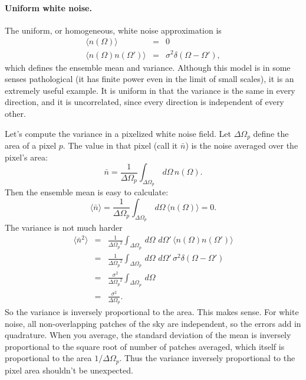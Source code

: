 \paragraph{Uniform white noise.}  The uniform, or homogeneous, white noise approximation is
\begin{eqnarray}
\langle n(\Omega) \rangle &=& 0 \nonumber \\
\langle n(\Omega) n(\Omega') \rangle &=& \sigma^2 \delta(\Omega - \Omega') ,
\end{eqnarray}
which defines the ensemble mean and variance.  Although this model is in some senses pathological (it has finite power even in the limit of small scales), it is an extremely useful example.  It is uniform in that the variance is the same in every direction, and it is uncorrelated, since every direction is independent of every other.

Let's compute the variance in a pixelized white noise field.  Let $\Delta\Omega_p$ define the area of a pixel $p$.  The value in that pixel (call it $\bar n$) is the noise averaged over the pixel's area:
\begin{equation}
\bar n = \frac{1}{\Delta\Omega_p} \int_{\Delta\Omega_p} \,d\Omega\, n(\Omega).
\end{equation}
Then the ensemble mean is easy to calculate:
\begin{equation}
\langle \bar n \rangle= \frac{1}{\Delta\Omega_p} \int_{\Delta\Omega_p} \,d\Omega\, \langle n(\Omega) \rangle = 0.
\end{equation}
The variance is not much harder
\begin{eqnarray}
\langle \bar n^2 \rangle &=& \frac{1}{{\Delta\Omega_p}^2} \int_{\Delta\Omega_p}  \,d\Omega\, \,d\Omega'\,\langle n(\Omega) n(\Omega') \rangle \nonumber \\
&=& \frac{1}{{\Delta\Omega_p}^2} \int_{\Delta\Omega_p}  \,d\Omega\, \,d\Omega'\,\sigma^2 \delta(\Omega - \Omega') \nonumber \\
&=& \frac{\sigma^2}{{\Delta\Omega_p}^2} \int_{\Delta\Omega_p}  \,d\Omega \nonumber \\
&=& \frac{\sigma^2}{{\Delta\Omega_p}}.
\end{eqnarray}
So the variance is inversely proportional to the area.  This makes sense.  For white noise, all non-overlapping patches of the sky are independent, so the errors add in quadrature.  When you average, the standard deviation of the mean is inversely proportional to the square root of number of patches averaged, which itself is proportional to the area $1/{\Delta\Omega_p}$.  Thus the variance inversely proportional to the pixel area shouldn't be unexpected.
 
